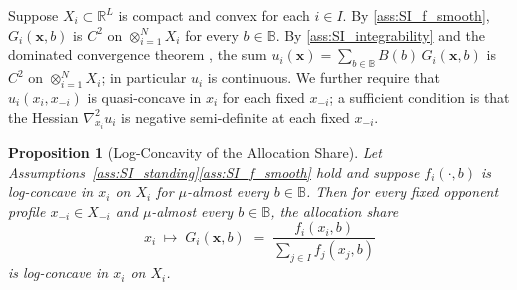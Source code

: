 \documentclass{article}
\newtheorem{proposition}[theorem]{Proposition}
\begin{document}
            Suppose $X_i \subset \mathbb{R}^L$ is compact and convex for each $i \in I$. By \ref{ass:SI_f_smooth}, $G_i(\mathbf{x},b)$ is $C^2$ on $\otimes_{i=1}^N X_i$ for every $b \in \mathbb{B}$. By \ref{ass:SI_integrability} and the dominated convergence theorem \cite[Thm.~1.34]{rudin1987real}, the sum $u_i(\mathbf{x}) = \sum_{b \in \mathbb{B}} B(b)\,G_i(\mathbf{x},b)$ is $C^2$ on $\otimes_{i=1}^N X_i$; in particular $u_i$ is continuous. We further require that $u_i(x_i, x_{-i})$ is quasi-concave in $x_i$ for each fixed $x_{-i}$; a sufficient condition is that the Hessian $\nabla^2_{x_i}u_i$ is negative semi-definite at each fixed $x_{-i}$. 
            \begin{proposition}[Log-Concavity of the Allocation Share]\label{prop:SI_Gi_logconcave}
                Let Assumptions~\ref{ass:SI_standing}\ref{ass:SI_f_smooth} hold and suppose $f_i(\cdot,b)$ is log-concave in $x_i$ on $X_i$ for $\mu$-almost every $b\in\mathbb{B}$. Then for every fixed opponent profile $x_{-i}\in X_{-i}$ and $\mu$-almost every $b\in\mathbb{B}$, the allocation share
                \[
                    x_i \;\mapsto\; G_i(\mathbf{x},b) \;=\; \frac{f_i(x_i,b)}{\displaystyle\sum_{j\in I}f_j(x_j,b)}
                \]
                is log-concave in $x_i$ on $X_i$.
            \end{proposition}
\end{document}
